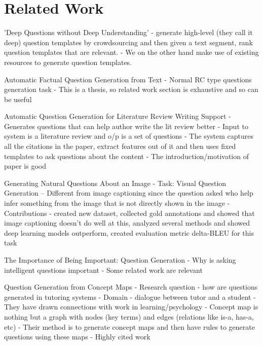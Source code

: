 \documentclass[11pt]{article}
\begin{document}
\section{}

\section{Related Work} \label{related_work}

'Deep Questions without Deep Understanding' 
- generate high-level (they call it deep) question templates by crowdsourcing and then given a text segment, rank question templates that are relevant. 
- We on the other hand make use of existing resources to generate question templates. 

Automatic Factual Question Generation from Text 
- Normal RC type questions generation task
- This is a thesis, so related work section is exhaustive and so can be useful

Automatic Question Generation for Literature Review Writing Support
- Generates questions that can help author write the lit review better
- Input to system is a literature review and o/p is a set of questions
- The system captures all the citations in the paper, extract features out of it and then uses fixed templates to ask questions about the content
- The introduction/motivation of paper is good
						
Generating Natural Questions About an Image 
- Task: Visual Question Generation -- Different from image captioning since the question asked who help infer something from the image that is not directly shown in the image
- Contributions - created new dataset, collected gold annotations and showed that image captioning doesn't do well at this, analyzed several methods and showed deep learning models outperform, created evaluation metric delta-BLEU for this task
			
The Importance of Being Important: Question Generation 
- Why is asking intelligent questions important
- Some related work are relevant

Question Generation from Concept Maps
- Research question - how are questions generated in tutoring systems
- Domain - dialogue between tutor and a student
- They have drawn connections with work in learning/psychology
- Concept map is nothing but a graph with nodes (key terms) and edges (relations like is-a, has-a, etc)
- Their method is to generate concept maps and then have rules to generate questions using these maps
- Highly cited work
\end{document}
